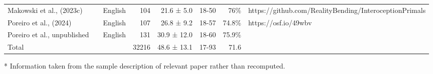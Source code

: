 \begin{table}
\begin{tabular*}{\linewidth}{@{\extracolsep{\fill}}lllrrrrl}
Makowski et al., (2023c) &  & English & 104 & 21.6 ± 5.0 & 18-50 & 76\% & https://github.com/RealityBending/InteroceptionPrimals \\ 
Poreiro et al., (2024) &  & English & 107 & 26.8 ± 9.2 & 18-57 & 74.8\% & https://osf.io/49wbv \\ 
Poreiro et al., unpublished &  & English & 131 & 30.9 ± 12.0 & 18-60 & 75.9\% &  \\ 
Total &  &  & 32216 & 48.6 ± 13.1 & 17-93 & 71.6 &  \\ 
\bottomrule
\end{tabular*}
\begin{minipage}{\linewidth}
* Information taken from the sample description of relevant paper rather than recomputed.\\
\end{minipage}
\end{table}

